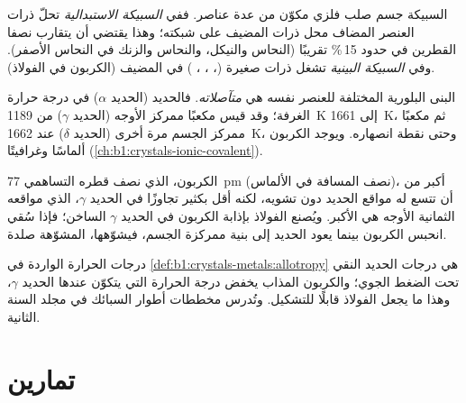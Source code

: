 \begin{definition}[السبائك]\label{def:b1:crystals-metals:alloy}
السبيكة جسم صلب فلزي مكوّن من عدة عناصر. ففي
\emph{السبيكة الاستبدالية} تحلّ ذرات
العنصر المضاف محل ذرات المضيف على شبكته؛ وهذا يقتضي
أن يتقارب نصفا القطرين في حدود 15\,\% تقريبًا (النحاس والنيكل، والنحاس
والزنك في النحاس الأصفر). وفي \emph{السبيكة البينية}
تشغل ذرات صغيرة (، ، ، )  في
المضيف (الكربون في الفولاذ).
\end{definition}

\begin{definition}[التآصل]\label{def:b1:crystals-metals:allotropy}
البنى البلورية المختلفة للعنصر نفسه هي
\emph{متآصلاته}. فالحديد  (الحديد $\alpha$) في درجة حرارة
الغرفة؛ وقد قيس مكعبًا ممركز الأوجه (الحديد $\gamma$) من \qty{1189}{K}
إلى \qty{1661}{K}، ثم مكعبًا ممركز الجسم مرة أخرى (الحديد $\delta$) عند \qty{1662}{K}، وحتى
نقطة انصهاره. ويوجد الكربون ألماسًا وغرافيتًا
(\cref{ch:b1:crystals-ionic-covalent}).
\end{definition}

\begin{example}[الفولاذ]\label{ex:b1:crystals-metals:steel}
الكربون، الذي نصف قطره التساهمي \qty{77}{pm} (نصف المسافة  في
الألماس)، أكبر من أن تتسع له مواقع الحديد دون تشويه، لكنه
أقل بكثير تجاوزًا في الحديد $\gamma$، الذي مواقعه الثمانية الأوجه هي الأكبر. ويُصنع
الفولاذ بإذابة الكربون في الحديد $\gamma$ الساخن؛ فإذا سُقي انحبس
الكربون بينما يعود الحديد إلى بنية ممركزة الجسم، فيشوّهها،
 المشوّهة صلدة.
\end{example}

\begin{remark}\label{rem:b1:crystals-metals:iron-T}
درجات الحرارة الواردة في \cref{def:b1:crystals-metals:allotropy} هي درجات
الحديد النقي تحت الضغط الجوي؛ والكربون المذاب يخفض
درجة الحرارة التي يتكوّن عندها الحديد $\gamma$، وهذا ما يجعل الفولاذ قابلًا للتشكيل.
وتُدرس مخططات أطوار السبائك في مجلد السنة الثانية.
\end{remark}

\section{تمارين}

